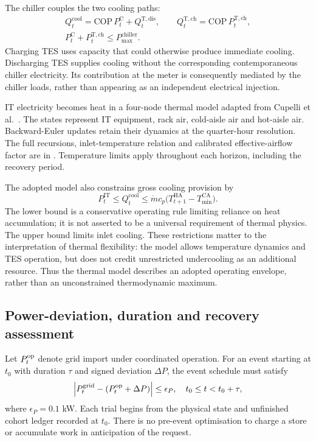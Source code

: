 The chiller couples the two cooling paths:
\begin{equation}
\begin{gathered}
Q_t^{\mathrm{cool}}=\mathrm{COP}\,P_t^{\mathrm{C}}+Q_t^{\mathrm{T,dis}},\qquad
Q_t^{\mathrm{T,ch}}=\mathrm{COP}\,P_t^{\mathrm{T,ch}},\\
P_t^{\mathrm{C}}+P_t^{\mathrm{T,ch}}\leq P_{\max}^{\mathrm{chiller}}.
\end{gathered}
\label{eq:cooling}
\end{equation}
Charging TES uses capacity that could otherwise produce immediate cooling. Discharging TES supplies cooling without the corresponding contemporaneous chiller electricity. Its contribution at the meter is consequently mediated by the chiller loads, rather than appearing as an independent electrical injection.

IT electricity becomes heat in a four-node thermal model adapted from Cupelli et al.~\cite{cupelli2018data}. The states represent IT equipment, rack air, cold-aisle air and hot-aisle air. Backward-Euler updates retain their dynamics at the quarter-hour resolution. The full recursions, inlet-temperature relation and calibrated effective-airflow factor are in . Temperature limits apply throughout each horizon, including the recovery period.

The adopted model also constrains gross cooling provision by
\begin{equation}
P_t^{\mathrm{IT}}\leq Q_t^{\mathrm{cool}}\leq
\dot m c_p\bigl(T_{t+1}^{\mathrm{HA}}-T_{\min}^{\mathrm{CA}}\bigr).
\label{eq:coolbound}
\end{equation}
The lower bound is a conservative operating rule limiting reliance on heat accumulation; it is not asserted to be a universal requirement of thermal physics. The upper bound limits inlet cooling. These restrictions matter to the interpretation of thermal flexibility: the model allows temperature dynamics and TES operation, but does not credit unrestricted undercooling as an additional resource. Thus the thermal model describes an adopted operating envelope, rather than an unconstrained thermodynamic maximum.

\subsection{Power-deviation, duration and recovery assessment}
Let $P_t^{\mathrm{op}}$ denote grid import under coordinated operation. For an event starting at $t_0$ with duration $\tau$ and signed deviation $\Delta P$, the event schedule must satisfy
\begin{equation}
\left|P_t^{\mathrm{grid}}-(P_t^{\mathrm{op}}+\Delta P)\right|
\leq\epsilon_P,\quad t_0\leq t<t_0+\tau,
\label{eq:target}
\end{equation}
where $\epsilon_P=0.1$ kW. Each trial begins from the physical state and unfinished cohort ledger recorded at $t_0$. There is no pre-event optimisation to charge a store or accumulate work in anticipation of the request.

